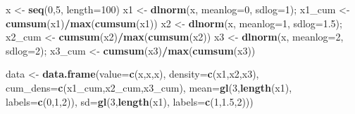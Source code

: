 \documentclass[]{book}
\newenvironment{Shaded}{\begin{snugshade}}{\end{snugshade}}
\newcommand{\KeywordTok}[1]{\textcolor[rgb]{0.13,0.29,0.53}{\textbf{#1}}}
\newcommand{\DataTypeTok}[1]{\textcolor[rgb]{0.13,0.29,0.53}{#1}}
\newcommand{\DecValTok}[1]{\textcolor[rgb]{0.00,0.00,0.81}{#1}}
\newcommand{\FloatTok}[1]{\textcolor[rgb]{0.00,0.00,0.81}{#1}}
\newcommand{\StringTok}[1]{\textcolor[rgb]{0.31,0.60,0.02}{#1}}
\newcommand{\OperatorTok}[1]{\textcolor[rgb]{0.81,0.36,0.00}{\textbf{#1}}}
\newcommand{\NormalTok}[1]{#1}
\begin{document}
\begin{Shaded}
\begin{Highlighting}[]
\NormalTok{x <-}\StringTok{ }\KeywordTok{seq}\NormalTok{(}\DecValTok{0}\NormalTok{,}\DecValTok{5}\NormalTok{, }\DataTypeTok{length=}\DecValTok{100}\NormalTok{)}
\NormalTok{x1 <-}\StringTok{ }\KeywordTok{dlnorm}\NormalTok{(x, }\DataTypeTok{meanlog=}\DecValTok{0}\NormalTok{, }\DataTypeTok{sdlog=}\DecValTok{1}\NormalTok{); x1_cum <-}\StringTok{ }\KeywordTok{cumsum}\NormalTok{(x1)}\OperatorTok{/}\KeywordTok{max}\NormalTok{(}\KeywordTok{cumsum}\NormalTok{(x1))}
\NormalTok{x2 <-}\StringTok{ }\KeywordTok{dlnorm}\NormalTok{(x, }\DataTypeTok{meanlog=}\DecValTok{1}\NormalTok{, }\DataTypeTok{sdlog=}\FloatTok{1.5}\NormalTok{); x2_cum <-}\StringTok{ }\KeywordTok{cumsum}\NormalTok{(x2)}\OperatorTok{/}\KeywordTok{max}\NormalTok{(}\KeywordTok{cumsum}\NormalTok{(x2))}
\NormalTok{x3 <-}\StringTok{ }\KeywordTok{dlnorm}\NormalTok{(x, }\DataTypeTok{meanlog=}\DecValTok{2}\NormalTok{, }\DataTypeTok{sdlog=}\DecValTok{2}\NormalTok{); x3_cum <-}\StringTok{ }\KeywordTok{cumsum}\NormalTok{(x3)}\OperatorTok{/}\KeywordTok{max}\NormalTok{(}\KeywordTok{cumsum}\NormalTok{(x3))}

\NormalTok{data <-}\StringTok{ }\KeywordTok{data.frame}\NormalTok{(}\DataTypeTok{value=}\KeywordTok{c}\NormalTok{(x,x,x),}
                   \DataTypeTok{density=}\KeywordTok{c}\NormalTok{(x1,x2,x3),}
                   \DataTypeTok{cum_dens=}\KeywordTok{c}\NormalTok{(x1_cum,x2_cum,x3_cum),}
                   \DataTypeTok{mean=}\KeywordTok{gl}\NormalTok{(}\DecValTok{3}\NormalTok{,}\KeywordTok{length}\NormalTok{(x1),}
                       \DataTypeTok{labels=}\KeywordTok{c}\NormalTok{(}\DecValTok{0}\NormalTok{,}\DecValTok{1}\NormalTok{,}\DecValTok{2}\NormalTok{)),}
                   \DataTypeTok{sd=}\KeywordTok{gl}\NormalTok{(}\DecValTok{3}\NormalTok{,}\KeywordTok{length}\NormalTok{(x1),}
                        \DataTypeTok{labels=}\KeywordTok{c}\NormalTok{(}\DecValTok{1}\NormalTok{,}\FloatTok{1.5}\NormalTok{,}\DecValTok{2}\NormalTok{)))}


\end{Highlighting}
\end{Shaded}
\end{document}
